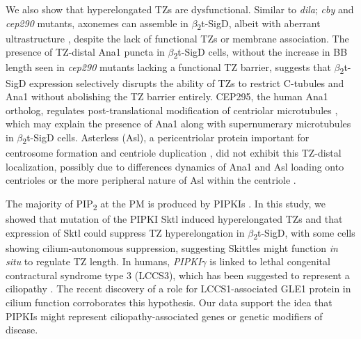 \documentclass[12pt, twoside, letterpaper]{article}
\newcommand{\PIP}{PIP\textsubscript{2}}
\newcommand{\sigd}{$\beta$\textsubscript{2}t-SigD}
\begin{document}
\begin{doublespacing}
\begin{linenumbers}
    We also show that hyperelongated TZs are dysfunctional.
    Similar to \textit{dila}; \textit{cby} \citep{vieillard2016transition} and
    \textit{cep290} \citep{basiri2014migrating}
    mutants, axonemes can assemble in \sigd{}, albeit
    with aberrant ultrastructure
    \citep{wei2008depletion}, despite the lack of functional TZs
    or membrane association.
    The presence of TZ-distal Ana1 puncta in \sigd{} cells, without the increase
    in BB length seen in \textit{cep290} mutants lacking a functional TZ barrier,
    suggests that \sigd{} expression selectively disrupts the ability of TZs to restrict C-tubules and
    Ana1 without abolishing the TZ barrier entirely.
    CEP295, the human Ana1 ortholog, regulates
    post-translational modification of centriolar
    microtubules \citep{chang2016cep295}, which may explain the presence of Ana1 along with
    supernumerary microtubules in \sigd{} cells.
    Asterless (Asl), a pericentriolar protein
    important for centrosome formation and centriole duplication
    \citep{blachon2008drosophila, dzhindzhev2010asterless}, did not
    exhibit this TZ-distal localization, possibly due to differences dynamics of Ana1 and Asl
    loading onto centrioles \citep{fu2016conserved, saurya2016drosophila} or the
    more peripheral nature of Asl within the centriole \citep{blachon2008drosophila}.

    The majority of \PIP{} at the PM is produced by PIPKIs
    \citep{balla2013phosphoinositides, hammond2012pi4p}.
    In this study, we showed that mutation of the PIPKI Sktl
    induced hyperelongated TZs
    and that expression of Sktl could suppress TZ hyperelongation in \sigd{},
    with some cells showing cilium-autonomous suppression,
    suggesting Skittles might function \textit{in situ} to regulate TZ length.
    In humans, \textit{PIPKI$\gamma$} is linked to lethal congenital contractural
    syndrome type 3 (LCCS3), which has been suggested to represent a ciliopathy
    \citep{xu2016phosphatidylinositol}.
    The recent discovery of a role for LCCS1-associated GLE1 protein in cilium
    function \citep{jao2017role} corroborates this hypothesis.
    Our data support the idea that PIPKIs might represent ciliopathy-associated genes
    or genetic modifiers of disease.


\end{linenumbers}
\end{doublespacing}
\end{document}
